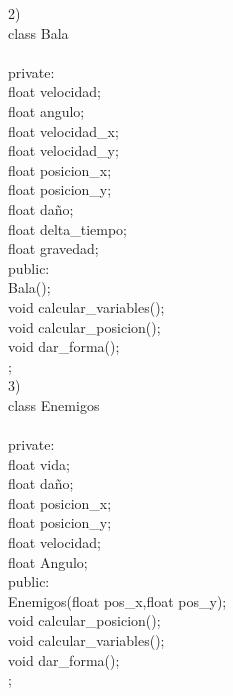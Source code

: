 \documentclass{article}
\begin{document}
2)\\
class Bala\\
{\\
private:\\
    float velocidad;\\
    float angulo;\\
    float velocidad_x;\\
    float velocidad_y;\\
    float posicion_x;\\
    float posicion_y;\\
    float daño; \\
    float delta_tiempo;\\
    float gravedad;\\
    
public:\\
    Bala();\\
    void calcular_variables();\\
    void calcular_posicion();\\
    void dar_forma();\\
    
};\\

3)\\
class Enemigos\\
{\\
private:\\
    float vida;\\
    float  daño;\\
    float  posicion_x;\\
    float  posicion_y;\\
    float  velocidad;\\
    float Angulo;\\
    
    
public:\\
    Enemigos(float pos_x,float pos_y);\\
    void  calcular_posicion();\\
    void  calcular_variables();\\
    void  dar_forma();\\
};\\
\end{document}
